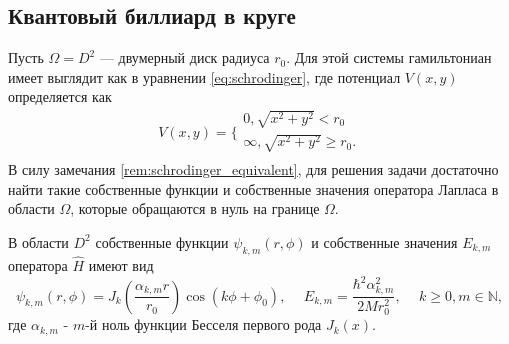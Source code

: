 \subsection{Квантовый биллиард в круге}\label{sec:ch1/sec1/sub3}
Пусть $\Omega = D^2$ --- двумерный диск радиуса $r_0$. Для этой системы гамильтониан имеет выглядит как в уравнении \eqref{eq:schrodinger}, где 
потенциал $V(x,y)$ определяется как
\[
    V(x, y) = 
    \Bigg\{
    \begin{array}{cc}
        0, \sqrt{x^2+y^2} < r_0 \\
        \infty, \sqrt{x^2+y^2} \geq r_0. \\
    \end{array}
\] 
В силу замечания \ref{rem:schrodinger_equivalent}, для решения задачи достаточно найти такие собственные функции и собственные значения оператора Лапласа в области $\Omega$, которые обращаются в нуль на границе $\Omega$.
\begin{statement}
В области $D^2$ собственные функции $\psi_{k, m}(r, \phi)$ и собственные значения $E_{k,m}$ оператора $\hat{H}$ имеют вид 
$$\psi_{k, m}(r, \phi) = J_k\left(\frac{\alpha_{k, m}r}{r_0}\right)\cos{(k \phi + \phi_0)}, \hspace{15pt} E_{k,m} = \frac{\hbar^2 \alpha_{k, m}^2}{2Mr_0^2}, \hspace{15pt} k \geq 0, m \in \mathbb{N},$$
где $\alpha_{k, m}$ - $m$-й ноль функции Бесселя первого рода $J_k(x)$.
\label{st:sec1_stat1}
\end{statement}
